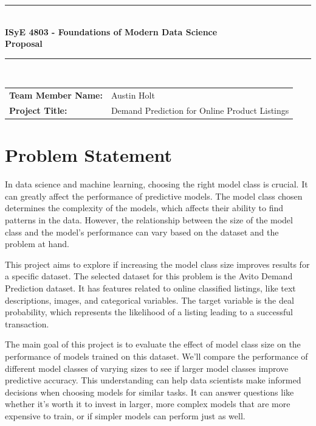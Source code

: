 \documentclass{article}
\begin{document}
\begin{centering}		
	\rule{\linewidth}{1mm} \\[0.5cm]
	{ \LARGE \bfseries ISyE 4803 - Foundations of Modern Data Science \\[0.2cm]
		Proposal}\\[0.5cm]
	\rule{\linewidth}{1mm} \\[1cm]
	
		\begin{tabular}{l p{5cm}}
		\textbf{Team Member Name:} & Austin Holt  \\
		\textbf{Project Title:} & Demand Prediction for Online Product Listings \\
		\end{tabular} 
\end{centering}

\vspace{2mm}

\section{Problem Statement}

In data science and machine learning, choosing the right model class is crucial. It can greatly affect the performance of predictive models. The model class chosen determines the complexity of the models, which affects their ability to find patterns in the data. However, the relationship between the size of the model class and the model’s performance can vary based on the dataset and the problem at hand.

This project aims to explore if increasing the model class size improves results for a specific dataset. The selected dataset for this problem is the Avito Demand Prediction dataset. It has features related to online classified listings, like text descriptions, images, and categorical variables. The target variable is the deal probability, which represents the likelihood of a listing leading to a successful transaction.

The main goal of this project is to evaluate the effect of model class size on the performance of models trained on this dataset. We’ll compare the performance of different model classes of varying sizes to see if larger model classes improve predictive accuracy. This understanding can help data scientists make informed decisions when choosing models for similar tasks. It can answer questions like whether it’s worth it to invest in larger, more complex models that are more expensive to train, or if simpler models can perform just as well.
\end{document}
